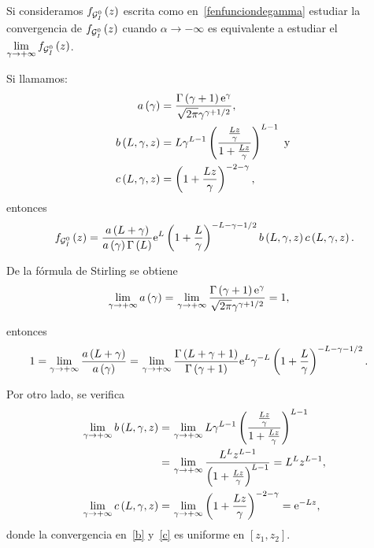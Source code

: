 \begin{dem}
Si consideramos $f_{\mathcal{G}_I^0}\left( z \right)$ escrita como en~\eqref{fenfunciondegamma} estudiar la convergencia de $f_{\mathcal{G}_I^0}\left( z \right)$ cuando $\alpha\to -\infty$ es equivalente a estudiar el $\lim\limits_{\gamma\to+\infty} f_{\mathcal{G}_I^0}\left( z \right)$. 
		
Si llamamos:
	\begin{align*}
		a\left( \gamma \right) &= \frac{\Gamma\left( \gamma+1 \right)\mathrm{e}^{\gamma}}{\sqrt{2\pi}\gamma^{\gamma+1/2}},\\
		b\left( L,\gamma,z \right) &=L\gamma^{L-1}\left( \frac{\frac{Lz}{\gamma}}{1+\frac{Lz}{\gamma}} \right)^{L-1} \text{ y }\\
		c\left( L,\gamma,z \right) &= \left( 1+\frac{Lz}{\gamma} \right)^{-2-\gamma},
	\end{align*}
entonces 
\begin{align}
\label{GIOfunciongamma}
f_{\mathcal{G}_I^0}\left( z \right) = \frac{a\left( L+\gamma \right)}{a\left( \gamma \right)\Gamma\left( L \right)}\mathrm{e}^{L}\left( 1+\frac{L}{\gamma} \right)^{-L-\gamma-1/2}
b\left( L,\gamma,z \right)c\left( L,\gamma,z \right).
\end{align}


De la fórmula de Stirling se obtiene
	\begin{align*}
	\lim_{\gamma\to+\infty} a\left( \gamma \right) = 
	&\, \lim_{\gamma\to+\infty}\frac{\Gamma\left( \gamma+1 \right)\mathrm{e}^{\gamma}}{\sqrt{2\pi}\gamma^{\gamma+1/2}} = 1,
	\end{align*}
	
entonces
	\begin{align*}
	1=\lim_{\gamma\to+\infty} \frac{a\left( L+\gamma \right)}{a\left( \gamma \right)} = 
	&\, \lim_{\gamma\to+\infty}\frac{\Gamma\left( L+\gamma+1 \right)}{\Gamma\left( \gamma+1 \right)}
	\mathrm{e}^{L}\gamma^{-L}\left( 1+\frac{L}{\gamma} \right)^{-L-\gamma-1/2}.
	\end{align*}

	Por otro lado, se verifica 
	\begin{align}
	\label{b}
	\nonumber \lim_{\gamma\to+\infty} b\left( L,\gamma,z \right) =
	&\, \lim_{\gamma\to+\infty}L\gamma^{L-1}\left( \frac{\frac{Lz}{\gamma}}{1+\frac{Lz}{\gamma}} \right)^{L-1} \\
	= &\, \lim_{\gamma\to+\infty} \frac{L^{L} z^{L-1}}{\left( 1+\frac{Lz}{\gamma} \right)^{L-1}} = L^{L} z^{L-1},\\
	\lim_{\gamma\to+\infty} c\left( L,\gamma,z \right) = &\, \lim_{\gamma\to+\infty}\left( 1+\frac{Lz}{\gamma} \right)^{-2-\gamma} = \mathrm{e}^{-Lz},
	\label{c}
	\end{align}
	donde la convergencia en~\eqref{b} y~\eqref{c} es uniforme en $[z_{1},z_{2}]$.
	

\end{dem}
